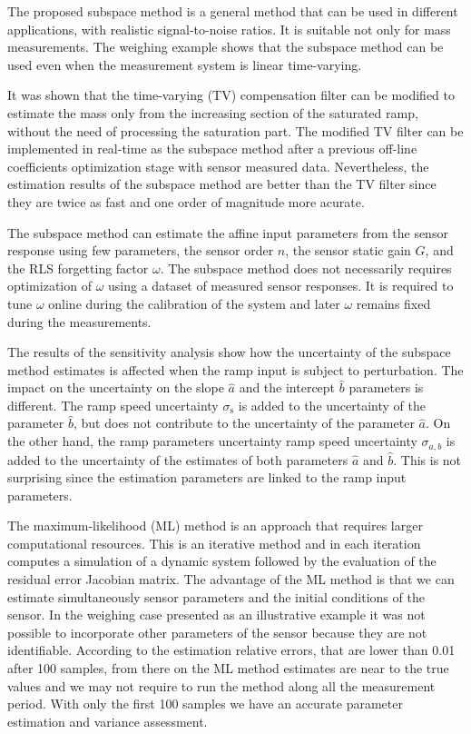 The proposed subspace method is a general method that can be used in different applications, with realistic signal-to-noise ratios. 
It is suitable not only for mass measurements.
The weighing example shows that the subspace method can be used even when the measurement system is linear time-varying.

It was shown that the time-varying (TV) compensation filter can be modified to estimate the mass only from the increasing section of the saturated ramp, without the need of processing the saturation part.
The modified TV filter can be implemented in real-time as the subspace method after a previous off-line coefficients optimization stage with sensor measured data.
Nevertheless, the estimation results of the subspace method are better than the TV filter since they are twice as fast and one order of magnitude more acurate.

The subspace method can estimate the affine input parameters from the sensor response using few parameters, the sensor order $n$, the sensor static gain ${G}$, and the RLS forgetting factor $\omega$.
The subspace method does not necessarily requires optimization of $\omega$ using a dataset of measured sensor responses.
It is required to tune $\omega$ online during the calibration of the system and later $\omega$ remains fixed during the measurements.

The results of the sensitivity analysis show how the uncertainty of the subspace method estimates is affected when the ramp input is subject to perturbation.
The impact on the uncertainty on the slope $\widehat{a}$ and the intercept $\widehat{b}$ parameters is different.
The ramp speed uncertainty $\sigma_{\mathrm{s}}$ is added to the uncertainty of the parameter $\widehat{b}$, but does not contribute to the uncertainty of the parameter $\widehat{a}$.
On the other hand, the ramp parameters uncertainty ramp speed uncertainty $\sigma_{a,b}$ is added to the uncertainty of the estimates of both parameters $\widehat{a}$ and $\widehat{b}$.
This is not surprising since the estimation parameters are linked to the ramp input parameters.

The maximum-likelihood (ML) method is an approach that requires larger computational resources.
This is an iterative method and in each iteration computes a simulation of a dynamic system followed by the evaluation of the residual error Jacobian matrix.
The advantage of the ML method is that we can estimate simultaneously sensor parameters and the initial conditions of the sensor.
In the weighing case presented as an illustrative example it was not possible to incorporate other parameters of the sensor because they are not identifiable.
According to the estimation relative errors, that are lower than 0.01 after 100 samples, from there on the ML method estimates are near to the true values and we may not require to run the method along all the measurement period.
With only the first 100 samples we have an accurate parameter estimation and variance assessment.

